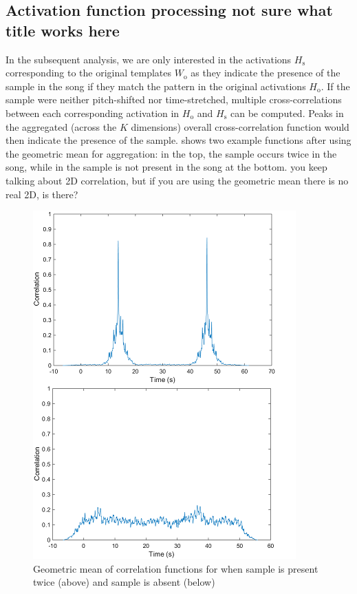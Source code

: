 \documentclass{article}
\begin{document}
\subsection{Activation function processing {\color{red}not sure what title works here}
}
In the subsequent analysis, we are only interested in the activations $H_\mathrm{s}$ corresponding to the original templates $W_\mathrm{o}$ as they indicate the presence of the sample in the song if they match the pattern in the original activations $H_\mathrm{o}$. If the sample were neither pitch-shifted nor time-stretched, multiple cross-correlations between each corresponding activation in $H_\mathrm{o}$ and $H_\mathrm{s}$ can be computed. Peaks in the aggregated (across the $K$ dimensions) overall cross-correlation function would then indicate the presence of the sample.  shows two example functions after using the geometric mean for aggregation: in the top, the sample occurs twice in the song, while in the sample is not present in the song at the bottom. {\color{red}you keep talking about 2D correlation, but if you are using the geometric mean there is no real 2D, is there?}

\begin{figure}[t]
\centering
\includegraphics[width=\linewidth]{corr.png}
\caption{Geometric mean of correlation functions for when sample is present twice (above) and sample is absent (below)}
\label{fig1}
\end{figure}
\end{document}
